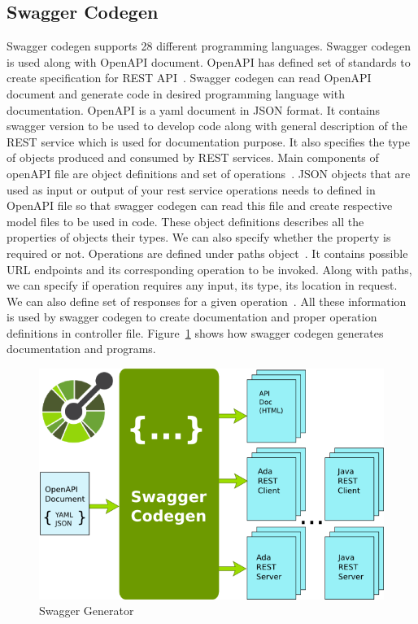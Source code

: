 \subsection{Swagger Codegen}
Swagger codegen supports 28 different programming languages. Swagger codegen is
used along with OpenAPI document. OpenAPI has defined set of standards to
create specification for REST API~\cite{hid-sp18-502-swagger}. Swagger codegen
can read OpenAPI document
and generate code in desired programming language with documentation. OpenAPI
is a yaml document in JSON format. It contains swagger version to be used to
develop code along with general description of the REST service which is used
for documentation purpose. It also specifies the type of objects produced and
consumed by REST services. Main components of openAPI file are object
definitions and set of operations~\cite{hid-sp18-502-swagger}. JSON objects
that are used as input or
output of your rest service operations needs to defined in OpenAPI file so that
swagger codegen can read this file and create respective model files to be
used in code.
These object definitions describes all the properties of objects their types.
We can also specify whether the property is required or not. Operations are
defined under paths object~\cite{hid-sp18-502-swagger}. It contains possible
URL endpoints and its
corresponding operation to be invoked. Along with paths, we can specify if
operation requires any input, its type, its location in request. We can also
define set of responses for a given operation~\cite{hid-sp18-502-swagger}.
All these information is used by
swagger codegen to create documentation and proper operation definitions in
controller file. Figure~\ref{fig:swagger-generator} shows how swagger codegen
generates documentation and programs.

\begin{figure}[!ht]
        \centering\includegraphics[width=\columnwidth]
        {image/swagger-generator.PNG}
        \caption{Swagger Generator~\cite{hid-sp18-502-swagger}}
        \label{fig:swagger-generator}
\end{figure}


